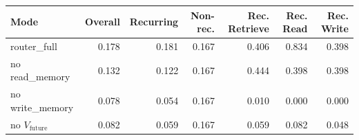 \begin{tabular}{lrrrrrr}
\toprule
Mode & Overall & Recurring & Non-rec. & Rec. Retrieve & Rec. Read & Rec. Write \\
\midrule
router\_full & 0.178 & 0.181 & 0.167 & 0.406 & 0.834 & 0.398 \\
no read\_memory & 0.132 & 0.122 & 0.167 & 0.444 & 0.398 & 0.398 \\
no write\_memory & 0.078 & 0.054 & 0.167 & 0.010 & 0.000 & 0.000 \\
no $V_{\text{future}}$ & 0.082 & 0.059 & 0.167 & 0.059 & 0.082 & 0.048 \\
\bottomrule
\end{tabular}

